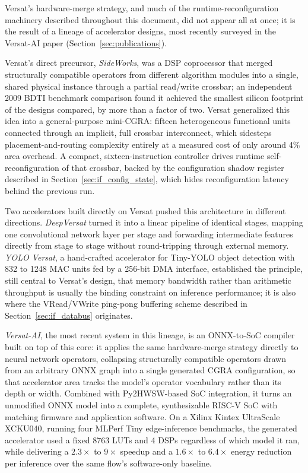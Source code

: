 %

Versat's hardware-merge strategy, and much of the runtime-reconfiguration
machinery described throughout this document, did not appear all at once;
it is the result of a lineage of accelerator designs, most recently
surveyed in the Versat-AI paper (Section~\ref{sec:publications}).

Versat's direct precursor, \emph{SideWorks}, was a DSP coprocessor that
merged structurally compatible operators from different algorithm modules
into a single, shared physical instance through a partial read/write
crossbar; an independent 2009 BDTI benchmark comparison found it achieved
the smallest silicon footprint of the designs compared, by more than a
factor of two. Versat generalized this idea into a general-purpose
mini-CGRA: fifteen heterogeneous functional units connected through an
implicit, full crossbar interconnect, which sidesteps
placement-and-routing complexity entirely at a measured cost of only
around 4\% area overhead. A compact, sixteen-instruction controller drives
runtime self-reconfiguration of that crossbar, backed by the
configuration shadow register described in Section~\ref{sec:if_config_state},
which hides reconfiguration latency behind the previous run.

Two accelerators built directly on Versat pushed this architecture in
different directions. \emph{DeepVersat} turned it into a linear pipeline
of identical stages, mapping one convolutional network layer per stage and
forwarding intermediate features directly from stage to stage without
round-tripping through external memory. \emph{YOLO Versat}, a
hand-crafted accelerator for Tiny-YOLO object detection with 832 to 1248
MAC units fed by a 256-bit DMA interface, established the principle,
still central to Versat's design, that memory bandwidth rather than
arithmetic throughput is usually the binding constraint on inference
performance; it is also where the VRead/VWrite ping-pong buffering scheme
described in Section~\ref{sec:if_databus} originates.

\emph{Versat-AI}, the most recent system in this lineage, is an ONNX-to-SoC
compiler built on top of this core: it applies the same hardware-merge
strategy directly to neural network operators, collapsing structurally
compatible operators drawn from an arbitrary ONNX graph into a single
generated CGRA configuration, so that accelerator area tracks the model's
operator vocabulary rather than its depth or width. Combined with
Py2HWSW-based SoC integration, it turns an unmodified ONNX model into a
complete, synthesizable RISC-V SoC with matching firmware and application
software. On a Xilinx Kintex UltraScale XCKU040, running four MLPerf Tiny
edge-inference benchmarks, the generated accelerator used a fixed 8763
LUTs and 4 DSPs regardless of which model it ran, while delivering a
$2.3\times$ to $9\times$ speedup and a $1.6\times$ to $6.4\times$ energy
reduction per inference over the same flow's software-only baseline.
